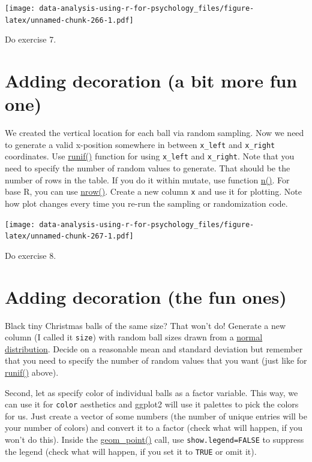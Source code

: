 \documentclass[
]{book}
\begin{document}
\texttt{[image: data-analysis-using-r-for-psychology\_files/figure-latex/unnamed-chunk-266-1.pdf]}

Do exercise 7.

\hypertarget{adding-decoration-a-bit-more-fun-one}{%
\section{Adding decoration (a bit more fun one)}\label{adding-decoration-a-bit-more-fun-one}}

We created the vertical location for each ball via random sampling. Now we need to generate a valid x-position somewhere in between \texttt{x\_left} and \texttt{x\_right} coordinates. Use \href{https://stat.ethz.ch/R-manual/R-devel/library/stats/html/Uniform.html}{runif()} function for using \texttt{x\_left} and \texttt{x\_right}. Note that you need to specify the number of random values to generate. That should be the number of rows in the table. If you do it within mutate, use function \href{https://dplyr.tidyverse.org/reference/context.html}{n()}. For base R, you can use \href{https://stat.ethz.ch/R-manual/R-devel/library/base/html/nrow.html}{nrow()}. Create a new column \texttt{x} and use it for plotting. Note how plot changes every time you re-run the sampling or randomization code.

\texttt{[image: data-analysis-using-r-for-psychology\_files/figure-latex/unnamed-chunk-267-1.pdf]}

Do exercise 8.

\hypertarget{adding-decoration-the-fun-ones}{%
\section{Adding decoration (the fun ones)}\label{adding-decoration-the-fun-ones}}

Black tiny Christmas balls of the same size? That won't do! Generate a new column (I called it \texttt{size}) with random ball sizes drawn from a \href{https://stat.ethz.ch/R-manual/R-devel/library/stats/html/Normal.html}{normal distribution}. Decide on a reasonable mean and standard deviation but remember that you need to specify the number of random values that you want (just like for \href{https://stat.ethz.ch/R-manual/R-devel/library/stats/html/Uniform.html}{runif()} above).

Second, let as specify color of individual balls as a factor variable. This way, we can use it for \texttt{color} aesthetics and ggplot2 will use it palettes to pick the colors for us. Just create a vector of some numbers (the number of unique entries will be your number of colors) and convert it to a factor (check what will happen, if you won't do this). Inside the \href{https://ggplot2.tidyverse.org/reference/geom_point.html}{geom\_point()} call, use \texttt{show.legend=FALSE} to suppress the legend (check what will happen, if you set it to \texttt{TRUE} or omit it).
\end{document}

